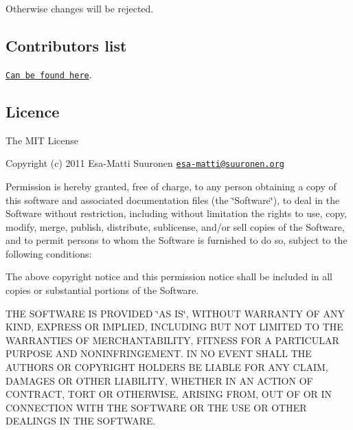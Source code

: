 Otherwise changes will be rejected.

\subsection*{Contributors list}

\href{https://github.com/epeli/underscore.string/graphs/contributors}{\tt Can be found here}.

\subsection*{Licence}

The M\+I\+T License

Copyright (c) 2011 Esa-\/\+Matti Suuronen \href{mailto:esa-matti@suuronen.org}{\tt esa-\/matti@suuronen.\+org}

Permission is hereby granted, free of charge, to any person obtaining a copy of this software and associated documentation files (the \char`\"{}\+Software\char`\"{}), to deal in the Software without restriction, including without limitation the rights to use, copy, modify, merge, publish, distribute, sublicense, and/or sell copies of the Software, and to permit persons to whom the Software is furnished to do so, subject to the following conditions\+:

The above copyright notice and this permission notice shall be included in all copies or substantial portions of the Software.

T\+H\+E S\+O\+F\+T\+W\+A\+R\+E I\+S P\+R\+O\+V\+I\+D\+E\+D \char`\"{}\+A\+S I\+S\char`\"{}, W\+I\+T\+H\+O\+U\+T W\+A\+R\+R\+A\+N\+T\+Y O\+F A\+N\+Y K\+I\+N\+D, E\+X\+P\+R\+E\+S\+S O\+R I\+M\+P\+L\+I\+E\+D, I\+N\+C\+L\+U\+D\+I\+N\+G B\+U\+T N\+O\+T L\+I\+M\+I\+T\+E\+D T\+O T\+H\+E W\+A\+R\+R\+A\+N\+T\+I\+E\+S O\+F M\+E\+R\+C\+H\+A\+N\+T\+A\+B\+I\+L\+I\+T\+Y, F\+I\+T\+N\+E\+S\+S F\+O\+R A P\+A\+R\+T\+I\+C\+U\+L\+A\+R P\+U\+R\+P\+O\+S\+E A\+N\+D N\+O\+N\+I\+N\+F\+R\+I\+N\+G\+E\+M\+E\+N\+T. I\+N N\+O E\+V\+E\+N\+T S\+H\+A\+L\+L T\+H\+E A\+U\+T\+H\+O\+R\+S O\+R C\+O\+P\+Y\+R\+I\+G\+H\+T H\+O\+L\+D\+E\+R\+S B\+E L\+I\+A\+B\+L\+E F\+O\+R A\+N\+Y C\+L\+A\+I\+M, D\+A\+M\+A\+G\+E\+S O\+R O\+T\+H\+E\+R L\+I\+A\+B\+I\+L\+I\+T\+Y, W\+H\+E\+T\+H\+E\+R I\+N A\+N A\+C\+T\+I\+O\+N O\+F C\+O\+N\+T\+R\+A\+C\+T, T\+O\+R\+T O\+R O\+T\+H\+E\+R\+W\+I\+S\+E, A\+R\+I\+S\+I\+N\+G F\+R\+O\+M, O\+U\+T O\+F O\+R I\+N C\+O\+N\+N\+E\+C\+T\+I\+O\+N W\+I\+T\+H T\+H\+E S\+O\+F\+T\+W\+A\+R\+E O\+R T\+H\+E U\+S\+E O\+R O\+T\+H\+E\+R D\+E\+A\+L\+I\+N\+G\+S I\+N T\+H\+E S\+O\+F\+T\+W\+A\+R\+E. 